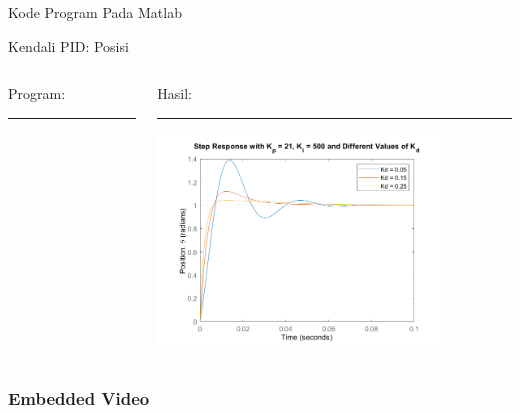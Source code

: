 \documentclass [xcolor={dvipsnames}, t] {beamer}
\begin{document}
\begin{frame}{Kode Program Pada Matlab}
	
\end{frame}

\begin{frame}{Kendali PID: Posisi}
	\begin{columns}[T] %
		\begin{column}{0.48\textwidth}
			Program:
			\color{black}\rule{\linewidth}{4pt}
			
		\end{column}%
		\hfill%
		\begin{column}{0.48\textwidth}
			Hasil:
			\color{blue}\rule{\linewidth}{4pt}
			\begin{center}
				\includegraphics[width=7.5cm]{fig/PIDpos.png}
			\end{center}
		\end{column}
	\end{columns}
\end{frame}

\begin{frame}
	\frametitle{Embedded Video}  
	\begin{center}
	\end{center}
\end{frame}
\end{document}
